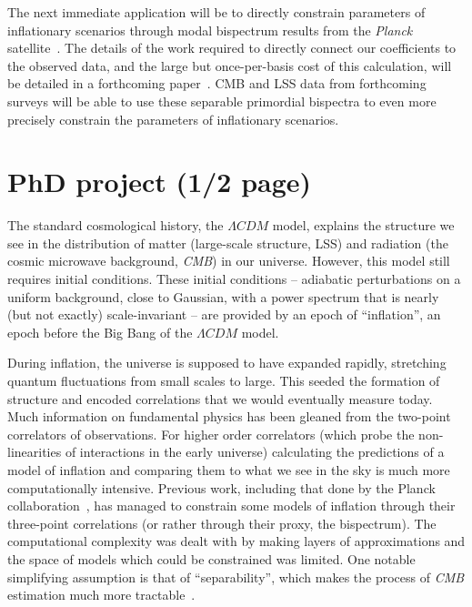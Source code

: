 The next immediate application will be to directly constrain parameters of
inflationary scenarios through modal bispectrum results from the \textit{Planck} satellite~\cite{Planck_NG_2018}.
The details of the work required to directly connect our coefficients to the observed data,
and the large but once-per-basis cost of this calculation, will be detailed in
a forthcoming paper~\cite{Sohn_2021}.
CMB and LSS data from forthcoming surveys will be able to use
these separable primordial bispectra to even more precisely constrain the
parameters of inflationary scenarios.

\section{PhD project (1/2 page)}
The standard cosmological history, the $\Lambda CDM$ model, explains the structure we see in the distribution of matter (large-scale structure, LSS) and radiation (the cosmic microwave background, \textit{CMB}) in our universe. However, this model still requires initial conditions. These initial conditions – adiabatic perturbations on a uniform background, close to Gaussian, with a power spectrum that is nearly (but not exactly) scale-invariant – are provided by an epoch of “inflation”, an epoch before the Big Bang of the $\Lambda CDM$ model. 

During inflation, the universe is supposed to have expanded rapidly, stretching quantum fluctuations from small scales to large. This seeded the formation of structure and encoded correlations that we would eventually measure today.
Much information on fundamental physics has been gleaned from the two-point correlators of observations. For higher order correlators (which probe the non-linearities of interactions in the early universe) calculating the predictions of a model of inflation and comparing them to what we see in the sky is much more computationally intensive. Previous work, including that done by the Planck collaboration~\cite{Planck_NG_2018}, has managed to constrain some models of inflation through their three-point correlations (or rather through their proxy, the bispectrum).
The computational complexity was dealt with by making layers of approximations and the space
of models which could be constrained was limited.
One notable simplifying assumption is that of “separability”, which makes the process of \textit{CMB} estimation much more tractable~\cite{Komatsu_2005}.


